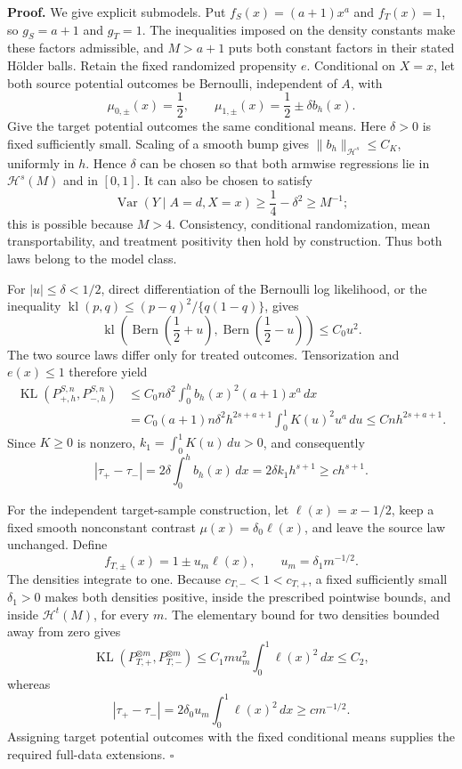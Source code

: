 \textbf{Proof.}
We give explicit submodels.  Put \(f_S(x)=(a+1)x^a\) and \(f_T(x)=1\), so \(g_S=a+1\) and \(g_T=1\).  The inequalities imposed on the density constants make these factors admissible, and \(M>a+1\) puts both constant factors in their stated Hölder balls.  Retain the fixed randomized propensity \(e\).  Conditional on \(X=x\), let both source potential outcomes be Bernoulli, independent of \(A\), with
\[
 \mu_{0,\pm}(x)=\frac12,
 \qquad
 \mu_{1,\pm}(x)=\frac12\pm\delta b_h(x).
\]
Give the target potential outcomes the same conditional means.  Here \(\delta>0\) is fixed sufficiently small.  Scaling of a smooth bump gives \(\|b_h\|_{\mathcal H^s}\le C_K\), uniformly in \(h\).  Hence \(\delta\) can be chosen so that both armwise regressions lie in \(\mathcal H^s(M)\) and in \([0,1]\).  It can also be chosen to satisfy
\[
 \operatorname{Var}(Y\mid A=d,X=x)\ge
 \frac14-\delta^2\ge M^{-1};
\]
this is possible because \(M>4\).  Consistency, conditional randomization, mean transportability, and treatment positivity then hold by construction.  Thus both laws belong to the model class.

For \(|u|\le\delta<1/2\), direct differentiation of the Bernoulli log likelihood, or the inequality \(\operatorname{kl}(p,q)\le(p-q)^2/\{q(1-q)\}\), gives
\[
 \operatorname{kl}\!\left(\operatorname{Bern}\left(\frac12+u\right),
 \operatorname{Bern}\left(\frac12-u\right)\right)\le C_0u^2.
\]
The two source laws differ only for treated outcomes.  Tensorization and \(e(x)\le1\) therefore yield
\[
 \begin{aligned}
 \operatorname{KL}(P_{+,h}^{S,n},P_{-,h}^{S,n})
 &\le C_0n\delta^2\int_0^h b_h(x)^2(a+1)x^a\,dx\\
 &=C_0(a+1)n\delta^2h^{2s+a+1}
   \int_0^1K(u)^2u^a\,du
 \le Cnh^{2s+a+1}.
 \end{aligned}
\]
Since \(K\ge0\) is nonzero, \(k_1=\int_0^1K(u)\,du>0\), and consequently
\[
 |\tau_+-\tau_-|
 =2\delta\int_0^h b_h(x)\,dx
 =2\delta k_1h^{s+1}\ge ch^{s+1}.
\]

For the independent target-sample construction, let \(\ell(x)=x-1/2\), keep a fixed smooth nonconstant contrast \(\mu(x)=\delta_0\ell(x)\), and leave the source law unchanged.  Define
\[
 f_{T,\pm}(x)=1\pm u_m\ell(x),\qquad u_m=\delta_1m^{-1/2}.
\]
The densities integrate to one.  Because \(c_{T,-}<1<c_{T,+}\), a fixed sufficiently small \(\delta_1>0\) makes both densities positive, inside the prescribed pointwise bounds, and inside \(\mathcal H^t(M)\), for every \(m\).  The elementary bound for two densities bounded away from zero gives
\[
 \operatorname{KL}(P_{T,+}^{\otimes m},P_{T,-}^{\otimes m})
 \le C_1m u_m^2\int_0^1\ell(x)^2\,dx\le C_2,
\]
whereas
\[
 |\tau_+-\tau_-|
 =2\delta_0u_m\int_0^1\ell(x)^2\,dx
 \ge c m^{-1/2}.
\]
Assigning target potential outcomes with the fixed conditional means supplies the required full-data extensions. \(\square\)